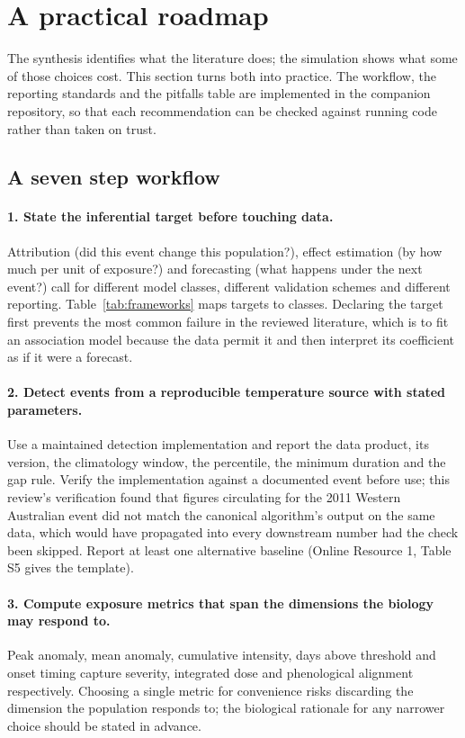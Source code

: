 \section{A practical roadmap}\label{sec:roadmap}

The synthesis identifies what the literature does; the simulation shows what some of those choices cost. This section turns both into practice. The workflow, the reporting standards and the pitfalls table are implemented in the companion repository, so that each recommendation can be checked against running code rather than taken on trust.

\subsection{A seven step workflow}\label{sec:workflow}

\paragraph{1. State the inferential target before touching data.}
Attribution (did this event change this population?), effect estimation (by how much per unit of exposure?) and forecasting (what happens under the next event?) call for different model classes, different validation schemes and different reporting. Table~\ref{tab:frameworks} maps targets to classes. Declaring the target first prevents the most common failure in the reviewed literature, which is to fit an association model because the data permit it and then interpret its coefficient as if it were a forecast.

\paragraph{2. Detect events from a reproducible temperature source with stated parameters.}
Use a maintained detection implementation and report the data product, its version, the climatology window, the percentile, the minimum duration and the gap rule. Verify the implementation against a documented event before use; this review's verification found that figures circulating for the 2011 Western Australian event did not match the canonical algorithm's output on the same data, which would have propagated into every downstream number had the check been skipped. Report at least one alternative baseline (Online Resource 1, Table S5 gives the template).

\paragraph{3. Compute exposure metrics that span the dimensions the biology may respond to.}
Peak anomaly, mean anomaly, cumulative intensity, days above threshold and onset timing capture severity, integrated dose and phenological alignment respectively. Choosing a single metric for convenience risks discarding the dimension the population responds to; the biological rationale for any narrower choice should be stated in advance.

